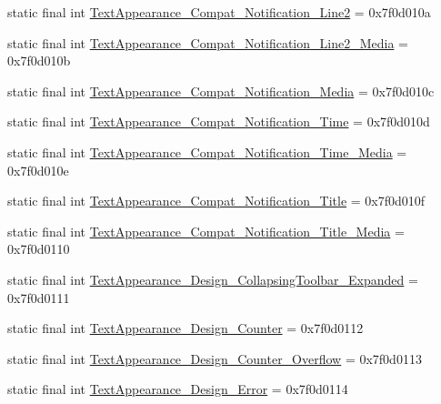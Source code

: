 \begin{DoxyCompactItemize}
\item 
static final int \mbox{\hyperlink{classandroid_1_1support_1_1design_1_1R_1_1style_a99d5d0816dc4e136d9c79cd8210772f1}{Text\+Appearance\+\_\+\+Compat\+\_\+\+Notification\+\_\+\+Line2}} = 0x7f0d010a
\item 
static final int \mbox{\hyperlink{classandroid_1_1support_1_1design_1_1R_1_1style_a8fa580dbbad63e141d1f783314843f38}{Text\+Appearance\+\_\+\+Compat\+\_\+\+Notification\+\_\+\+Line2\+\_\+\+Media}} = 0x7f0d010b
\item 
static final int \mbox{\hyperlink{classandroid_1_1support_1_1design_1_1R_1_1style_acf42b6f9cd6ea2fdcc71c5847e1aa944}{Text\+Appearance\+\_\+\+Compat\+\_\+\+Notification\+\_\+\+Media}} = 0x7f0d010c
\item 
static final int \mbox{\hyperlink{classandroid_1_1support_1_1design_1_1R_1_1style_aa6fb2ecafc656d3b597997e308536368}{Text\+Appearance\+\_\+\+Compat\+\_\+\+Notification\+\_\+\+Time}} = 0x7f0d010d
\item 
static final int \mbox{\hyperlink{classandroid_1_1support_1_1design_1_1R_1_1style_ad9e0e499e4087f2c67338031aa4b90ad}{Text\+Appearance\+\_\+\+Compat\+\_\+\+Notification\+\_\+\+Time\+\_\+\+Media}} = 0x7f0d010e
\item 
static final int \mbox{\hyperlink{classandroid_1_1support_1_1design_1_1R_1_1style_a2b750bbab2fe859efd2a6cecf5dcad34}{Text\+Appearance\+\_\+\+Compat\+\_\+\+Notification\+\_\+\+Title}} = 0x7f0d010f
\item 
static final int \mbox{\hyperlink{classandroid_1_1support_1_1design_1_1R_1_1style_a9bb3c62bf251619fda352ac6002f3115}{Text\+Appearance\+\_\+\+Compat\+\_\+\+Notification\+\_\+\+Title\+\_\+\+Media}} = 0x7f0d0110
\item 
static final int \mbox{\hyperlink{classandroid_1_1support_1_1design_1_1R_1_1style_a4467f1c04bd3fe1131c546ec3b57a5f9}{Text\+Appearance\+\_\+\+Design\+\_\+\+Collapsing\+Toolbar\+\_\+\+Expanded}} = 0x7f0d0111
\item 
static final int \mbox{\hyperlink{classandroid_1_1support_1_1design_1_1R_1_1style_a88c783c0b5d4d0703e95a3de58a29d41}{Text\+Appearance\+\_\+\+Design\+\_\+\+Counter}} = 0x7f0d0112
\item 
static final int \mbox{\hyperlink{classandroid_1_1support_1_1design_1_1R_1_1style_a3a009f705c884d470f8e7a76912e3a93}{Text\+Appearance\+\_\+\+Design\+\_\+\+Counter\+\_\+\+Overflow}} = 0x7f0d0113
\item 
static final int \mbox{\hyperlink{classandroid_1_1support_1_1design_1_1R_1_1style_accab8ab0c293a8370ea192578d8dbcec}{Text\+Appearance\+\_\+\+Design\+\_\+\+Error}} = 0x7f0d0114

\end{DoxyCompactItemize}
